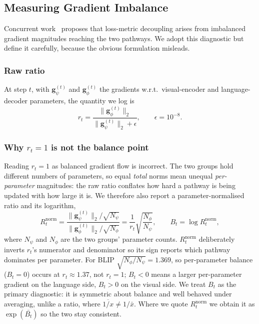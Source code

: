 \documentclass[journal]{IEEEtran}
\begin{document}
\subsection{Measuring Gradient Imbalance}
\label{sec:rt}
Concurrent work~\cite{li2025mbq,gim2025seesaw,paretolora2026}
proposes that loss-metric decoupling arises from imbalanced gradient
magnitudes reaching the two pathways. We adopt this diagnostic but
define it carefully, because the obvious formulation misleads.

\subsubsection{Raw ratio}
At step $t$, with $\mathbf{g}_\psi^{(t)}$ and
$\mathbf{g}_\phi^{(t)}$ the gradients w.r.t.\ visual-encoder and
language-decoder parameters, the quantity we log is
\begin{equation}
r_t = \frac{\lVert \mathbf{g}_\phi^{(t)} \rVert_2}
           {\lVert \mathbf{g}_\psi^{(t)} \rVert_2 + \epsilon},
\qquad \epsilon = 10^{-8}.
\label{eq:rt}
\end{equation}

\subsubsection{Why $r_t = 1$ is not the balance point}
Reading $r_t = 1$ as balanced gradient flow is incorrect. The two
groups hold different numbers of parameters, so equal \emph{total}
norms mean unequal \emph{per-parameter} magnitudes: the raw ratio
conflates how hard a pathway is being updated with how large it is. We
therefore also report a parameter-normalised ratio and its
logarithm,
\begin{equation}
R_t^{\mathrm{norm}} =
\frac{\lVert \mathbf{g}_\psi^{(t)}\rVert_2 / \sqrt{N_\psi}}
     {\lVert \mathbf{g}_\phi^{(t)}\rVert_2 / \sqrt{N_\phi}}
= \frac{1}{r_t}\sqrt{\frac{N_\phi}{N_\psi}},
\qquad
B_t = \log R_t^{\mathrm{norm}},
\label{eq:rtnorm}
\end{equation}
where $N_\psi$ and $N_\phi$ are the two groups' parameter counts.
$R_t^{\mathrm{norm}}$ deliberately inverts $r_t$'s numerator and
denominator so its sign reports which pathway dominates per parameter.
For BLIP $\sqrt{N_\phi/N_\psi} = 1.369$, so per-parameter balance
($B_t = 0$) occurs at $r_t \approx 1.37$, not $r_t = 1$; $B_t < 0$
means a larger per-parameter gradient on the language side, $B_t > 0$
on the visual side. We treat $B_t$ as the primary diagnostic: it is
symmetric about balance and well behaved under averaging, unlike a
ratio, where $\overline{1/x} \neq 1/\bar{x}$. Where we quote
$R_t^{\mathrm{norm}}$ we obtain it as $\exp(\bar{B_t})$ so the two
stay consistent.
\end{document}
